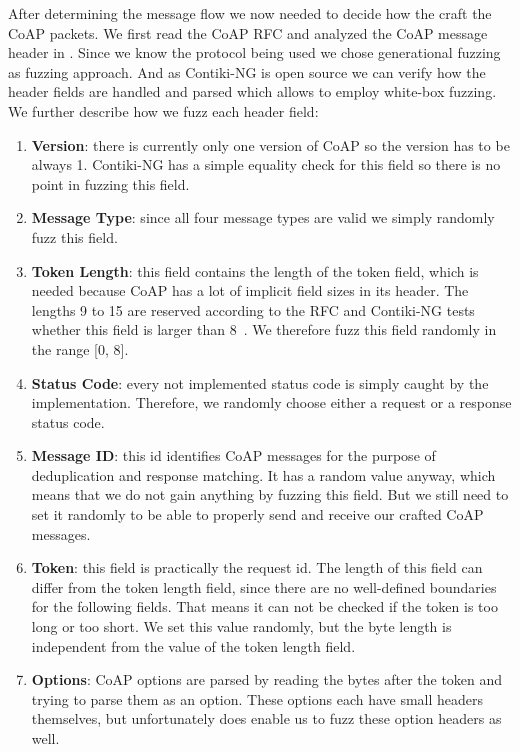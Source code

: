 After determining the message flow we now needed to decide how the craft the CoAP packets. We first read the CoAP RFC and analyzed the CoAP message header in . Since we know the protocol being used we chose generational fuzzing as fuzzing approach. And as Contiki-NG is open source we can verify how the header fields are handled and parsed which allows to employ white-box fuzzing. We further describe how we fuzz each header field:
\begin{enumerate}
	\item \textbf{Version}: there is currently only one version of CoAP so the version has to be always 1. Contiki-NG has a simple equality check for this field so there is no point in fuzzing this field.
	\item \textbf{Message Type}: since all four message types are valid we simply randomly fuzz this field.
	\item \textbf{Token Length}: this field contains the length of the token field, which is needed because CoAP has a lot of implicit field sizes in its header. The lengths 9 to 15 are reserved according to the RFC and Contiki-NG tests whether this field is larger than 8~\cite{RFC7252}. We therefore fuzz this field randomly in the range [0, 8].
	\item \textbf{Status Code}: every not implemented status code is simply caught by the implementation. Therefore, we randomly choose either a request or a response status code.
	\item \textbf{Message ID}: this id identifies CoAP messages for the purpose of deduplication and response matching. It has a random value anyway, which means that we do not gain anything by fuzzing this field. But we still need to set it randomly to be able to properly send and receive our crafted CoAP messages.
	\item \textbf{Token}: this field is practically the request id. The length of this field can differ from the token length field, since there are no well-defined boundaries for the following fields. That means it can not be checked if the token is too long or too short. We set this value randomly, but the byte length is independent from the value of the token length field.
	\item \textbf{Options}: CoAP options are parsed by reading the bytes after the token and trying to parse them as an option. These options each have small headers themselves, but unfortunately \scapy does enable us to fuzz these option headers as well.


\end{enumerate}
